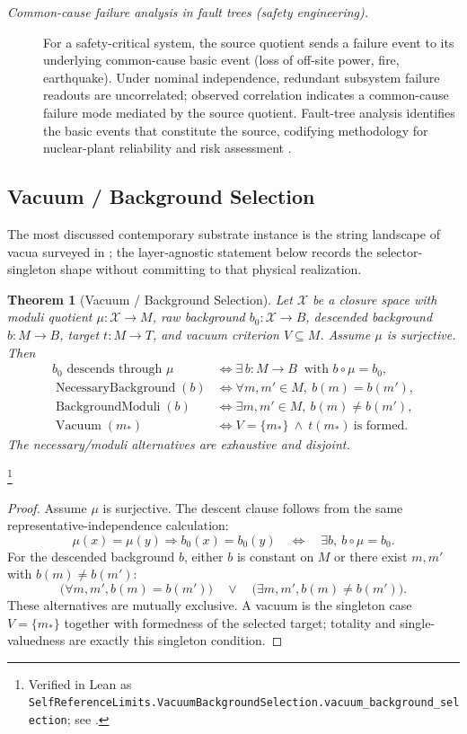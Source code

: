 \documentclass[11pt]{article}
\newtheorem{theorem}{Theorem}[section]
\theoremstyle{definition}
\begin{document}
\begin{description}
\item[\emph{Common-cause failure analysis in
fault trees (safety engineering).}]
For a safety-critical system, the source quotient
sends a failure event to its underlying
common-cause basic event (loss of off-site power,
fire,
earthquake).  Under nominal independence, redundant
subsystem failure readouts are uncorrelated;
observed correlation indicates a common-cause
failure mode mediated by the source quotient.  Fault-tree analysis
identifies the basic events that constitute the
source, codifying methodology for nuclear-plant
reliability and risk assessment
\citep{Vesely1981FaultTree}.
\end{description}

\subsection{Vacuum / Background Selection}\label{sec:self-reference-limits:vacuum}

The most discussed contemporary substrate instance is the string
landscape of vacua surveyed in \citet{Susskind2003Landscape};
the layer-agnostic statement below records the selector-singleton
shape without committing to that physical realization.

\begin{theorem}[Vacuum / Background Selection]\label{thm:F50}
Let \(\mathcal X\) be a closure space with moduli quotient
\(\mu:\mathcal X\to M\), raw background \(b_0:\mathcal X\to B\),
descended background \(b:M\to B\), target \(t:M\to T\), and vacuum
criterion \(V\subseteq M\). Assume \(\mu\) is surjective. Then
\begin{align*}
  b_0 \text{ descends through }\mu
  &\iff
  \exists\,b:M\to B\ \text{ with } b\circ\mu=b_0,\\
  \operatorname{NecessaryBackground}(b)
  &\iff \forall m,m'\in M,\ b(m)=b(m'),\\
  \operatorname{BackgroundModuli}(b)
  &\iff \exists m,m'\in M,\ b(m)\ne b(m'),\\
  \operatorname{Vacuum}(m_\ast)
  &\iff V=\{m_\ast\}\ \wedge\ t(m_\ast)\ \text{is formed}.
\end{align*}
The necessary/moduli alternatives are exhaustive and disjoint.
\end{theorem}
\footnote{\raggedright Verified in Lean as
\texttt{SelfReferenceLimits.\allowbreak{}VacuumBackgroundSelection.\allowbreak{}vacuum\_background\_selection};
see .}
\begin{proof}
Assume \(\mu\) is surjective. The descent clause follows from the
same representative-independence calculation:
\[
  \mu(x)=\mu(y)\Rightarrow b_0(x)=b_0(y)
  \quad\Longleftrightarrow\quad
  \exists b,\ b\circ\mu=b_0 .
\]
For the descended background \(b\), either \(b\) is constant on \(M\)
or there exist \(m,m'\) with \(b(m)\ne b(m')\):
\[
  \bigl(\forall m,m', b(m)=b(m')\bigr)
  \quad\vee\quad
  \bigl(\exists m,m', b(m)\ne b(m')\bigr).
\]
These alternatives are mutually exclusive. A vacuum is the singleton
case \(V=\{m_\ast\}\) together with formedness of the selected target;
totality and single-valuedness are exactly this singleton condition.
\end{proof}
\end{document}
